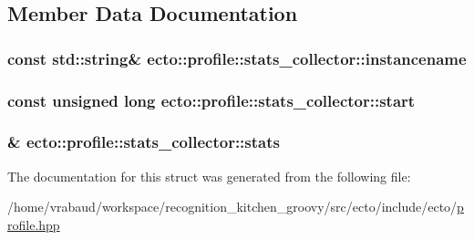 \subsection{\-Member \-Data \-Documentation}
\hypertarget{structecto_1_1profile_1_1stats__collector_ac3d5d7adf91b02719a6b897869683f03}{
\subsubsection[{instancename}]{\setlength{\rightskip}{0pt plus 5cm}const std\-::string\& {\bf ecto\-::profile\-::stats\-\_\-collector\-::instancename}}}\label{structecto_1_1profile_1_1stats__collector_ac3d5d7adf91b02719a6b897869683f03}
\hypertarget{structecto_1_1profile_1_1stats__collector_ae607313a8ecc75d6a6ab201cdf7c2d61}{
\subsubsection[{start}]{\setlength{\rightskip}{0pt plus 5cm}const unsigned long {\bf ecto\-::profile\-::stats\-\_\-collector\-::start}}}\label{structecto_1_1profile_1_1stats__collector_ae607313a8ecc75d6a6ab201cdf7c2d61}
\hypertarget{structecto_1_1profile_1_1stats__collector_a2c206fb60ea04b5162ec43a609f2a185}{
\subsubsection[{stats}]{\& {\bf ecto\-::profile\-::stats\-\_\-collector\-::stats}}}\label{structecto_1_1profile_1_1stats__collector_a2c206fb60ea04b5162ec43a609f2a185}


\-The documentation for this struct was generated from the following file\-:\begin{DoxyCompactItemize}
\item 
/home/vrabaud/workspace/recognition\-\_\-kitchen\-\_\-groovy/src/ecto/include/ecto/\hyperlink{profile_8hpp}{profile.\-hpp}\end{DoxyCompactItemize}
